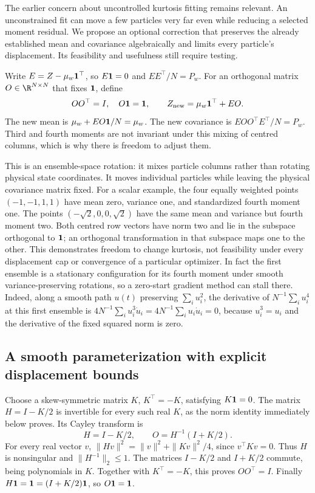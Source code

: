 The earlier concern about uncontrolled kurtosis fitting remains relevant.
An unconstrained fit can move a few particles very far even while reducing
a selected moment residual. We propose an optional correction that preserves
the already established mean and covariance algebraically and limits every
particle's displacement. Its feasibility and usefulness still require testing.

Write \(E=Z-\mu_w\mathbf 1^\top\), so \(E\mathbf 1=0\) and \(EE^\top/N=P_w\).
For an orthogonal matrix \(O\in\R^{N\times N}\) that fixes \(\mathbf 1\), define
\begin{equation}
\label{eq:bf-covariance-proposal-orthogonal-repair}
 OO^\top=I,\quad O\mathbf 1=\mathbf 1,\qquad
 Z_{\rm new}=\mu_w\mathbf 1^\top+EO.
\end{equation}
The new mean is \(\mu_w+EO\mathbf 1/N=\mu_w\).
The new covariance is \(EOO^\top E^\top/N=P_w\).
Third and fourth moments are not invariant under this mixing of centred
columns, which is why there is freedom to adjust them.

This is an ensemble-space rotation: it mixes particle columns rather than
rotating physical state coordinates. It moves individual particles while
leaving the physical covariance matrix fixed. For a scalar example, the
four equally weighted points \((-1,-1,1,1)\) have mean zero, variance one,
and standardized fourth moment one. The points
\((-\sqrt2,0,0,\sqrt2)\) have the same mean and variance but fourth moment
two. Both centred row vectors have norm two and lie in the subspace
orthogonal to \(\mathbf 1\); an orthogonal transformation in that subspace
maps one to the other. This demonstrates freedom to change kurtosis,
not feasibility under every displacement cap or convergence of a
particular optimizer. In fact the first ensemble is a stationary
configuration for its fourth moment under smooth variance-preserving
rotations, so a zero-start gradient method can stall there.
Indeed, along a smooth path \(u(t)\) preserving \(\sum_i u_i^2\),
the derivative of \(N^{-1}\sum_i u_i^4\) at this first ensemble is
\(4N^{-1}\sum_i u_i^3\dot u_i
=4N^{-1}\sum_i u_i\dot u_i=0\), because \(u_i^3=u_i\) and
the derivative of the fixed squared norm is zero.

\subsection{A smooth parameterization with explicit displacement bounds}

Choose a skew-symmetric matrix \(K\), \(K^\top=-K\), satisfying \(K\mathbf 1=0\).
The matrix \(H=I-K/2\) is invertible for every such real \(K\), as the
norm identity immediately below proves. Its Cayley transform is
\begin{equation}
\label{eq:bf-covariance-proposal-cayley}
 H=I-K/2,\qquad O=H^{-1}(I+K/2).
\end{equation}
For every real vector \(v\),
\(\|Hv\|^2=\|v\|^2+\|Kv\|^2/4\), since \(v^\top Kv=0\).
Thus \(H\) is nonsingular and \(\|H^{-1}\|_2\leq1\).
The matrices \(I-K/2\) and \(I+K/2\) commute, being polynomials in \(K\).
Together with \(K^\top=-K\), this proves \(OO^\top=I\).
Finally \(H\mathbf 1=\mathbf 1=(I+K/2)\mathbf 1\), so \(O\mathbf 1=\mathbf 1\).

